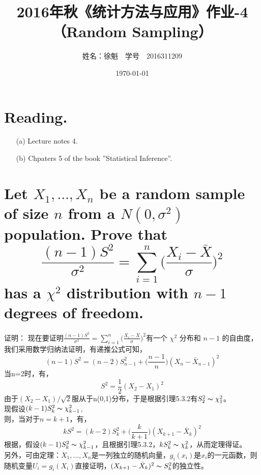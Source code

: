 \documentclass [12pt]{article}
\begin{document}
 \begin{CJK*}{GBK}{kai}
\newtheorem{theorem}{定理}
\newtheorem{definition}{定义}
\newtheorem{lemma}{引理}
\newtheorem{corollary}{推论}
\newtheorem{proposition}{性质}
\newtheorem{example}{例}
\newtheorem{remark}{注}
    \title{2016年秋《统计方法与应用》作业-4（Random Sampling）}
    \author{ 姓名：徐魁\,\,\,\, 学号~~{2016311209}}
    \date{\today}
\maketitle

\section{Reading. }
\begin{enumerate}
  \item[(a)] Lecture notes 4.
 \item[(b)] Chpaters 5 of the book ”Statistical Inference”.\\
 
\end{enumerate}

\section{Let $X_1, \ldots, X_n$ be a random sample of size $n$ from a $N(0, \sigma^2)$ population. Prove that
        \[
            \frac{(n-1)S^2}{\sigma^2} = \sum_{i=1}^n\Big(\frac{X_i-\bar{X}}{\sigma}\Big)^2
        \]
        has a $\chi^2$ distribution with $n-1$ degrees of freedom.}%
	证明：
		现在要证明$\frac{(n-1)S^2}{\sigma^2} = \sum_{i=1}^n\Big(\frac{X_i-\bar{X}}{\sigma}\Big)^2$有一个 $\chi^2$ 分布和 $n-1$ 的自由度，我们采用数学归纳法证明，有递推公式可知，
		\[
            		(n-1)S^2 = (n-2)S_{n-1}^2+\Big(\frac{n-1}{n}\Big)(X_{n}- \bar{X}_{n-1})^2
        		\]
		当n=2时，有，
		\[
			S^2 = \frac{1}{2}(X_2-X_1)^2
		\]
		由于$(X_2-X_1)/\sqrt{2}$服从于n(0,1)分布，于是根据引理5.3.2有$S_2^2 \thicksim \chi_1^2$。\\
		现假设$(k-1)S_{k}^2 \thicksim \chi_{k-1}^2$,\\
		则，当对于$n=k+1$，有，
		\[
            		kS^2 = (k-2)S_{k}^2+\Big(\frac{k}{k+1}\Big)(X_{k+1}- \bar{X}_{k})^2
        		\]
		根据，假设$(k-1)S_{k}^2 \thicksim \chi_{k-1}^2$，且根据引理5.3.2，$kS_{k}^2 \thicksim \chi_{k}^2$，从而定理得证。\\
		另外，可由定理：$X_1,...,X_n$是一列独立的随机向量，$g_i(x_i)$是$x_i$的一元函数，则随机变量$U_i=g_i(X_i)$直接证明，$(X_{k+1}- \bar{X}_{k})^2  \thicksim S_{k}^2 $的独立性。
		

\end{CJK*}
\end{document}
